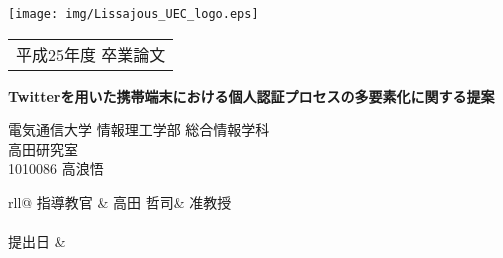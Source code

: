 \thispagestyle{empty}

\noindent
\texttt{[image: img/Lissajous\_UEC\_logo.eps]}\\
\begin{tabular}{c}
{\Large 平成25年度 卒業論文}				\\
\end{tabular}

\vspace{2.5cm}

\begin{center}
\LARGE \bf Twitterを用いた携帯端末における個人認証プロセスの多要素化に関する提案\\
\end{center}

\vspace{1.5cm}

\LARGE
\begin{flushright}
電気通信大学 情報理工学部 総合情報学科\\
高田研究室\\
1010086 高浪悟\\

\vspace{1.6zh}

{\def\arraystretch{0.6}
\begin{tabular}{rll@{}}
指導教官	& 高田 哲司& 准教授	\\
							\\
提出日	& 	\\
\end{tabular}
}
\end{flushright}
\normalsize
\newpage
